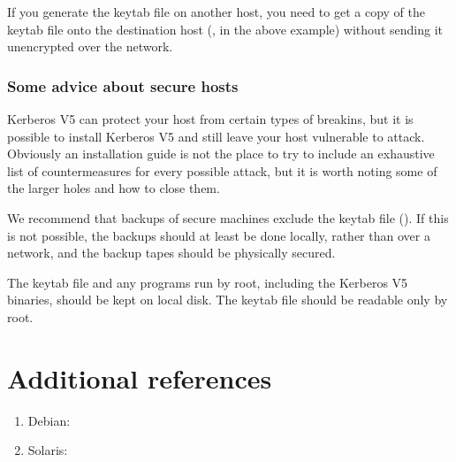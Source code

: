 \documentclass[letterpaper,10pt,english]{sphinxmanual}
\begin{document}
\sphinxAtStartPar
If you generate the keytab file on another host, you need to get a
copy of the keytab file onto the destination host (, in
the above example) without sending it unencrypted over the network.


\subsubsection{Some advice about secure hosts}
\label{\detokenize{admin/install_appl_srv:some-advice-about-secure-hosts}}
\sphinxAtStartPar
Kerberos V5 can protect your host from certain types of break\sphinxhyphen{}ins, but
it is possible to install Kerberos V5 and still leave your host
vulnerable to attack.  Obviously an installation guide is not the
place to try to include an exhaustive list of countermeasures for
every possible attack, but it is worth noting some of the larger holes
and how to close them.

\sphinxAtStartPar
We recommend that backups of secure machines exclude the keytab file
({\hyperref[\detokenize{mitK5defaults:paths}]{}}).  If this is not possible, the backups should at least be
done locally, rather than over a network, and the backup tapes should
be physically secured.

\sphinxAtStartPar
The keytab file and any programs run by root, including the Kerberos
V5 binaries, should be kept on local disk.  The keytab file should be
readable only by root.


\section{Additional references}
\label{\detokenize{admin/install:additional-references}}\begin{enumerate}
%
\item {} 
\sphinxAtStartPar
Debian: 

\item {} 
\sphinxAtStartPar
Solaris: 

\end{enumerate}

\sphinxstepscope
\end{document}
